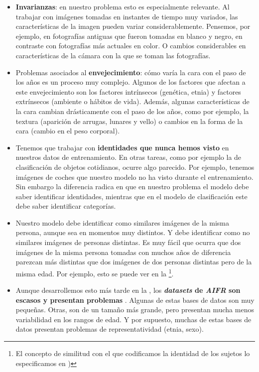 \begin{itemize}
	\item \textbf{Invarianzas}: en nuestro problema esto es especialmente relevante. Al trabajar con imágenes tomadas en instantes de tiempo muy variados, las características de la imagen pueden variar considerablemente. Pensemos, por ejemplo, en fotografías antiguas que fueron tomadas en blanco y negro, en contraste con fotografías más actuales en color. O cambios considerables en características de la cámara con la que se toman las fotografías.

	\item Problemas asociados al \textbf{envejecimiento}: cómo varía la cara con el paso de los años es un proceso muy complejo. Algunos de los factores que afectan a este envejecimiento \cite{informatica:tecnica_sintesis_aifr} son los factores intrínsecos (genética, etnia) y factores extrínsecos (ambiente o hábitos de vida). Además, algunas características de la cara cambian drásticamente con el paso de los años, como por ejemplo, la textura (aparición de arrugas, lunares y vello) o cambios en la forma de la cara (cambio en el peso corporal).

	\item Tenemos que trabajar con \textbf{identidades que nunca hemos visto} en nuestros datos de entrenamiento. En otras tareas, como por ejemplo la de clasificación de objetos cotidianos, ocurre algo parecido. Por ejemplo, tenemos imágenes de coches que nuestro modelo no ha visto durante el entrenamiento. Sin embargo la diferencia radica en que en nuestro problema el modelo debe saber identificar identidades, mientras que en el modelo de clasificación este debe saber identificar categorías.

	\item Nuestro modelo debe identificar como similares imágenes de la misma persona, aunque sea en momentos muy distintos. Y debe identificar como no similares imágenes de personas distintas. Es muy fácil que ocurra que dos imágenes de la misma persona tomadas con muchos años de diferencia parezcan más distintas que dos imágenes de dos personas distintas pero de la misma edad. Por ejemplo, esto se puede ver en la  \footnote{El concepto de similitud con el que codificamos la identidad de los sujetos lo especificamos en )}.

	\item Aunque desarrollemos esto más tarde en la , los \textbf{\textit{datasets} de \textit{AIFR} son escasos y presentan problemas} \cite{informatica:tecnica_sintesis_aifr}. Algunas de estas bases de datos son muy pequeñas. Otras, son de un tamaño más grande, pero presentan mucha menos variabilidad en los rangos de edad. Y por supuesto, muchas de estas bases de datos presentan problemas de representatividad (etnia, sexo).


\end{itemize}
